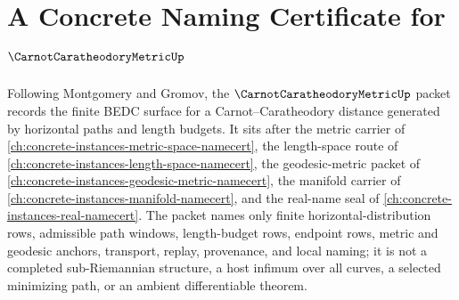 \chapter{A Concrete Naming Certificate for $\CarnotCaratheodoryMetricUp$}
\label{ch:concrete-instances-carnot-caratheodory-metric-namecert}

Following Montgomery and Gromov, the $\CarnotCaratheodoryMetricUp$ packet records the finite BEDC surface for a Carnot--Caratheodory distance generated by horizontal paths and length budgets. It sits after the metric carrier of \autoref{ch:concrete-instances-metric-space-namecert}, the length-space route of \autoref{ch:concrete-instances-length-space-namecert}, the geodesic-metric packet of \autoref{ch:concrete-instances-geodesic-metric-namecert}, the manifold carrier of \autoref{ch:concrete-instances-manifold-namecert}, and the real-name seal of \autoref{ch:concrete-instances-real-namecert}. The packet names only finite horizontal-distribution rows, admissible path windows, length-budget rows, endpoint rows, metric and geodesic anchors, transport, replay, provenance, and local naming; it is not a completed sub-Riemannian structure, a host infimum over all curves, a selected minimizing path, or an ambient differentiable theorem.

